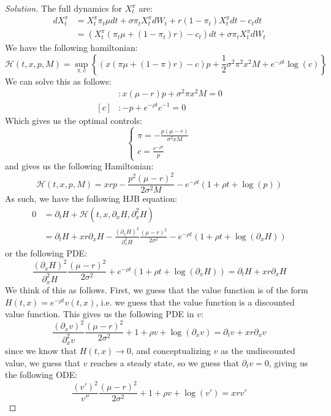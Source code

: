 \documentclass{amsart}
\begin{document}
\begin{proof}[Solution]
    The full dynamics for $X_t^\pi$ are: 
    \begin{align*}
        d X_t^\pi &= X_t^\pi \pi_t \mu dt + \sigma \pi_t X_t^\pi dW_t + r(1 - \pi_t) X_t^\pi dt - c_t dt\\
        &= (X_t^\pi (\pi_t \mu + (1 - \pi_t) r) - c_t) dt + \sigma \pi_t X_t^\pi dW_t
    \end{align*}
    We have the following hamiltonian: 
    \[
    \mathcal{H}(t, x, p, M) = \sup_{\pi, c} \left\{(x(\pi \mu + (1 - \pi)r ) - c)p + \frac{1}{2}\sigma^2 \pi^2 x^2 M + e^{-\rho t} \log{(c)}\right\}
    \]
    We can solve this as follows: 
    \begin{align*}
        [\pi]&: x(\mu - r) p + \sigma^2 \pi x^2 M = 0\\
        [c]&: -p + e^{-\rho t}c^{-1} = 0
    \end{align*}
    Which gives us the optimal controls: 
    \[
    \begin{cases}
        \pi = -\frac{p (\mu - r)}{\sigma^2 x M}\\
        c = \frac{e^{-\rho t}}{p}
    \end{cases}
    \]
    and gives us the following Hamiltonian:
    \[
    \mathcal{H}(t, x, p, M) = xrp - \frac{p^2(\mu - r)^2}{2\sigma^2 M} - e^{-\rho t} (1 + \rho t + \log{(p)})
    \]
    As such, we have the following HJB equation: 
    \begin{align*}
        0 &= \partial_t H + \mathcal{H}(t, x, \partial_x H, \partial^2_x H)\\
        &= \partial_t H + xr \partial_x H - \frac{(\partial_x H)^2}{\partial^2_x H} \frac{(\mu - r)^2}{2\sigma^2} - e^{-\rho t}(1 + \rho t + \log(\partial_x H))
    \end{align*}
    or the following PDE:
    \[
    \frac{(\partial_x H)^2}{\partial^2_x H} \frac{(\mu - r)^2}{2\sigma^2} + e^{-\rho t}(1 + \rho t + \log(\partial_x H)) = \partial_t H + xr \partial_x H
    \]
    We think of this as follows. First, we guess that the value function is of the form $H(t,x) = e^{-\rho t}v(t,x)$,
    i.e. we guess that the value function is a discounted value function.
    This gives us the following PDE in $v$: 
    \[
    \frac{(\partial_x v)^2}{\partial^2_x v} \frac{(\mu - r)^2}{2\sigma^2} + 1 + \rho v + \log(\partial_x v) = \partial_t v + xr \partial_x v
    \]
    since we know that $H(t,x) \to 0$, and conceptualizing $v$ as the undiscounted value, 
    we guess that $v$ reaches a steady state, so we guess that $\partial_t v = 0$, giving us the following ODE:
    \[
    \frac{(v')^2}{v''} \frac{(\mu - r)^2}{2 \sigma^2} + 1 + \rho v + \log(v') = xr v'
    \]


\end{proof}
\end{document}
